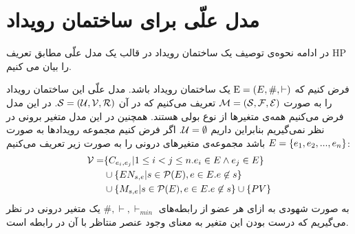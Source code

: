 \section{مدل علّی برای ساختمان رویداد}
\label{es-causal-model}
در ادامه نحوه‌ی توصیف یک ساختمان رویداد در قالب یک مدل علّی مطابق تعریف 
HP
را بیان می کنیم.

فرض کنیم که
$\mathrm{E} = (E,\#,\vdash)$
یک ساختمان رویداد باشد.
مدل علّی این ساختمان رویداد را به صورت
$\mathcal{M} = (\mathcal{S},\mathcal{F},\mathcal{E})$
تعریف می‌کنیم که در آن
$\mathcal{S} = (\mathcal{U},\mathcal{V},\mathcal{R})$.
در این مدل فرض می‌کنیم همه‌ی متغیر‌ها از نوع بولی هستند.
همچنین در این مدل متغیر برونی در نظر نمی‌گیریم بنابراین داریم
$\mathcal{U} = \emptyset$.
اگر فرض کنیم مجموعه‌ رویدادها به صورت
$E = \{e_1,e_2,...,e_n\}$
باشد مجموعه‌ی متغیر‌های درونی را به صورت زیر تعریف می‌کنیم:
\begin{align*}
    \mathcal{V} = & \{C_{e_i,e_j} |  1 \leq i < j \leq n.
    e_i \in E \wedge e_j \in E\}                              \\
                  & \cup \{EN_{s,e} | s \in \mathcal{P}(E),
    e \in E. e \not \in s \}                                  \\
                  & \cup \{M_{s,e} | s \in \mathcal{P}(E),
        e \in E. e \not \in s \} \cup \{PV\}
\end{align*}
به صورت شهودی به ازای هر عضو از رابطه‌های
$\#,\vdash,\vdash_{min}$
یک متغیر درونی در نظر می‌گیریم که درست بودن این متغیر به معنای وجود عنصر منتاظر با آن در رابطه است.

